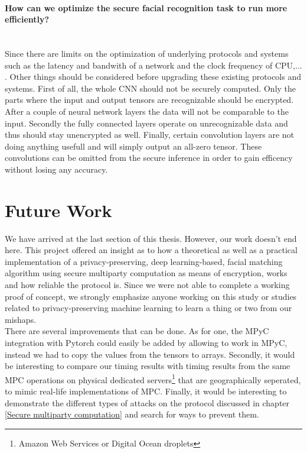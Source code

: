 \paragraph{How can we optimize the secure facial recognition task to run more efficiently?}\mbox{}
\\
Since there are limits on the optimization of underlying protocols and systems such as the latency and bandwith of a network and the clock frequency of CPU,... . Other things should be considered before upgrading these existing protocols and systems. First of all, the whole CNN should not be securely computed. Only the parts where the input and output tensors are recognizable should be encrypted. After a couple of neural network layers the data will not be comparable to the input. Secondly the fully connected layers operate on unrecognizable data and thus should stay unencrypted as well. Finally, certain convolution layers are not doing anything usefull and will simply output an all-zero tensor. These convolutions can be omitted from the secure inference in order to gain efficency without losing any accuracy.


\section{Future Work}
We have arrived at the last section of this thesis. However, our work doesn't end here. This project offered an insight as to how a theoretical as well as a practical implementation of a privacy-preserving, deep learning-based, facial matching algorithm using secure multiparty computation as means of encryption, works and how reliable the protocol is. Since we were not able to complete a working proof of concept, we strongly emphasize anyone working on this study or studies related to privacy-preserving machine learning to learn a thing or two from our mishaps.\\

There are several improvements that can be done. As for one, the MPyC integration with Pytorch could easily be added by allowing  to work in MPyC, instead we had to copy the values from the tensors to arrays. Secondly, it would be interesting to compare our timing results with timing results from the same MPC operations on physical dedicated servers\footnote{Amazon Web Services or Digital Ocean droplets} that are geographically seperated, to mimic real-life implementations of MPC. Finally, it would be interesting to demonstrate the different types of attacks on the protocol discussed in chapter \ref{Secure multiparty computation} and search for ways to prevent them.
